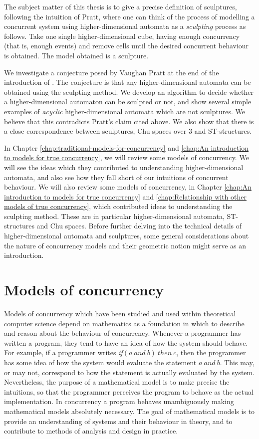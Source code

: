     The subject matter of this thesis is to give a precise definition of sculptures, following the intuition of Pratt, where one can think of the process of modelling a concurrent system using higher-dimensional automata as a \emph{sculpting} process as follows. Take one single higher-dimensional cube, having enough concurrency (that is, enough events) and remove cells until the desired concurrent behaviour is obtained. The model obtained is a sculpture.
    
    We investigate a conjecture posed by Vaughan Pratt at the end of the introduction of \cite{Pratt00Sculptures}. The conjecture is that any higher-dimensional automata can be obtained using the sculpting method. We develop an algorithm to decide whether a higher-dimensional automaton can be sculpted or not, and show several simple examples of \emph{acyclic} higher-dimensional automata which are not sculptures. We believe that this contradicts Pratt's claim cited above.  We also show that there is a close correspondence between sculptures, Chu spaces over 3 \cite{Pratt00Sculptures} and ST-structures.
    
    In Chapter \ref{chap:traditional-models-for-concurrency} and \ref{chap:An introduction to models for true concurrency}, we will review some models of concurrency. We will see the ideas which they contributed to understanding higher-dimensional automata, and also see how they fall short of our intuitions of concurrent behaviour. We will also review some models of concurrency, in Chapter \ref{chap:An introduction to models for true concurrency} and \ref{chap:Relationship with other models of true concurrency}, which contributed ideas to understanding the sculpting method. These are in particular higher-dimensional automata, ST-structures and Chu spaces. Before further delving into the technical details of higher-dimensional automata and sculptures, some general considerations about the nature of concurrency models and their geometric notion might serve as an introduction.
    
    \section{Models of concurrency}
        Models of concurrency which have been studied and used within theoretical computer science depend on mathematics as a foundation in which to describe and reason about the behaviour of concurrency. Whenever a programmer has written a program, they tend to have an idea of how the system should behave. For example, if a programmer writes \emph{if}$(a\ and\ b)\ then\ c$, then the programmer has some idea of how the system would evaluate the statement $a\ and\ b$. This may, or may not, correspond to how the statement is actually evaluated by the system. Nevertheless, the purpose of a mathematical model is to make precise the intuitions, so that the programmer perceives the program to behave as the actual implementation. In concurrency a program behaves unambiguously making mathematical models absolutely necessary. The goal of mathematical models is to provide an understanding of systems and their behaviour in theory, and to contribute to methods of analysis and design in practice.

